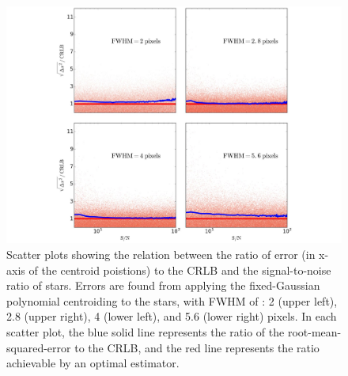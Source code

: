 \begin{figure}[p]~\\
\begin{center}
\includegraphics[width=\linewidth]{figures/centroiding/new_polynomial.pdf}
\caption{Scatter plots showing the relation between the ratio of error (in x-axis of the centroid poistions) to the CRLB and the signal-to-noise ratio of stars. 
Errors are found from applying the fixed-Gaussian polynomial centroiding to the stars,
with FWHM of : 2 (upper left), 2.8 (upper right), 4 (lower left), and 5.6 (lower right) pixels. In each scatter plot, the blue solid line represents the ratio of the root-mean-squared-error to the CRLB, and the red line represents the ratio achievable by an optimal estimator.}\label{3}
\end{center}
\end{figure}

